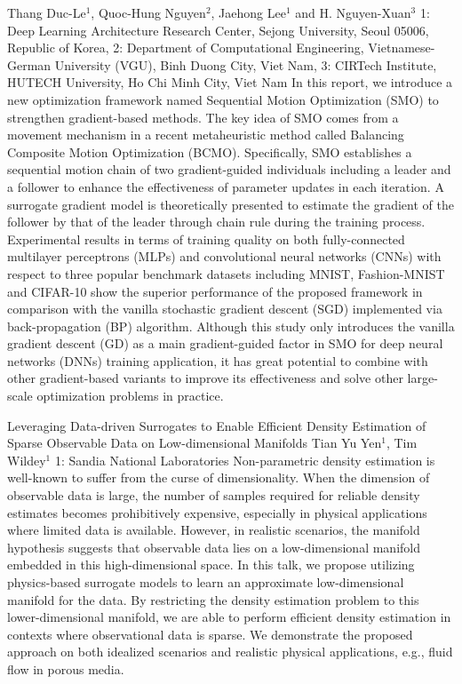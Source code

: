 \vspace{1.5ex}
{Thang Duc-Le$^{1}$, Quoc-Hung Nguyen$^{2}$, Jaehong Lee$^{1}$ and H. Nguyen-Xuan$^{3}$}
{1:  Deep Learning Architecture Research Center, Sejong University, Seoul 05006, Republic of Korea, 2: Department of Computational Engineering, Vietnamese-German University (VGU), Binh Duong City, Viet Nam, 3: CIRTech Institute, HUTECH University, Ho Chi Minh City, Viet Nam}
{In this report, we introduce a new optimization framework named Sequential Motion Optimization (SMO) to strengthen gradient-based methods. The key idea of SMO comes from a movement mechanism in a recent metaheuristic method called Balancing Composite Motion Optimization (BCMO). Specifically, SMO establishes a sequential motion chain of two gradient-guided individuals including a leader and a follower to enhance the effectiveness of parameter updates in each iteration. A surrogate gradient model is theoretically presented to estimate the gradient of the follower by that of the leader through chain rule during the training process. Experimental results in terms of training quality on both fully-connected multilayer perceptrons (MLPs) and convolutional neural networks (CNNs) with respect to three popular benchmark datasets including MNIST, Fashion-MNIST and CIFAR-10 show the superior performance of the proposed framework in comparison with the vanilla stochastic gradient descent (SGD) implemented via back-propagation (BP) algorithm. Although this study only introduces the vanilla gradient descent (GD) as a main gradient-guided factor in SMO for deep neural networks (DNNs) training application, it has great potential to combine with other gradient-based variants to improve its effectiveness and solve other large-scale optimization problems in practice.}


\vspace{1.5ex}
\abs
{Leveraging Data-driven Surrogates to Enable Efficient Density Estimation of Sparse Observable Data on Low-dimensional Manifolds}
{Tian Yu Yen$^1$, Tim Wildey$^1$}
{1: Sandia National Laboratories}
{Non-parametric density estimation is well-known to suffer from the curse of dimensionality. When the dimension of observable data is large, the number of samples required for reliable density estimates becomes prohibitively expensive, especially in physical applications where limited data is available. However, in realistic scenarios, the manifold hypothesis suggests that observable data lies on a low-dimensional manifold embedded in this high-dimensional space. In this talk, we propose utilizing physics-based surrogate models to learn an approximate low-dimensional manifold for the data. By restricting the density estimation problem to this lower-dimensional manifold, we are able to perform efficient density estimation in contexts where observational data is sparse. We demonstrate the proposed approach on both idealized scenarios and realistic physical applications, e.g., fluid flow in porous media.}


